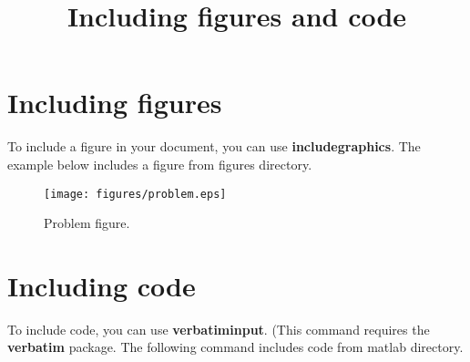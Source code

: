 \documentclass[12pt]{article}
\title{Including figures and code}
\begin{document}
\maketitle

\section{Including figures}
To include a figure in your document, you can use \textbf{includegraphics}.
The example below includes a figure from figures directory.   
\begin{figure}
\begin{center}
\texttt{[image: figures/problem.eps]}
\end{center}
\caption{Problem figure.}
\label{f-problem}
\end{figure}

\section{Including code}
To include code, you can use \textbf{verbatiminput}.  (This command requires
the \textbf{verbatim} package. The following command includes code from 
matlab directory. 

\end{document}
